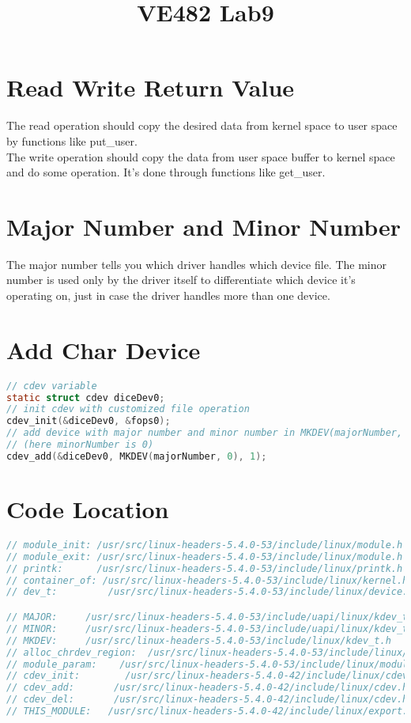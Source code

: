 \documentclass[a4paper]{article}
\title{VE482 Lab9}
\begin{document}
\maketitle

\section{Read Write Return Value}
The read operation should copy the desired data from kernel space to user space 
by functions like put\_user. \\
The write operation should copy the data from user space buffer to kernel space 
and do some operation. It's done through functions like get\_user.\\

\section{Major Number and Minor Number}
The major number tells you which driver handles which device file. 
The minor number is used only by the driver itself to differentiate which device it's operating on, just in case the driver handles more than one device.

\section{Add Char Device}
\begin{lstlisting}[language=c]
// cdev variable
static struct cdev diceDev0;
// init cdev with customized file operation
cdev_init(&diceDev0, &fops0);
// add device with major number and minor number in MKDEV(majorNumber, minorNumber) 
// (here minorNumber is 0)
cdev_add(&diceDev0, MKDEV(majorNumber, 0), 1);
\end{lstlisting}

\section{Code Location}
\begin{lstlisting}[language=c]
// module_init: /usr/src/linux-headers-5.4.0-53/include/linux/module.h
// module_exit: /usr/src/linux-headers-5.4.0-53/include/linux/module.h
// printk:      /usr/src/linux-headers-5.4.0-53/include/linux/printk.h
// container_of: /usr/src/linux-headers-5.4.0-53/include/linux/kernel.h
// dev_t:         /usr/src/linux-headers-5.4.0-53/include/linux/device.h

// MAJOR:     /usr/src/linux-headers-5.4.0-53/include/uapi/linux/kdev_t.h
// MINOR:     /usr/src/linux-headers-5.4.0-53/include/uapi/linux/kdev_t.h
// MKDEV:     /usr/src/linux-headers-5.4.0-53/include/linux/kdev_t.h
// alloc_chrdev_region:  /usr/src/linux-headers-5.4.0-53/include/linux/fs.h
// module_param:    /usr/src/linux-headers-5.4.0-53/include/linux/moduleparam.h
// cdev_init:        /usr/src/linux-headers-5.4.0-42/include/linux/cdev.h
// cdev_add:       /usr/src/linux-headers-5.4.0-42/include/linux/cdev.h
// cdev_del:       /usr/src/linux-headers-5.4.0-42/include/linux/cdev.h
// THIS_MODULE:   /usr/src/linux-headers-5.4.0-42/include/linux/export.h:
\end{lstlisting}
\end{document}
